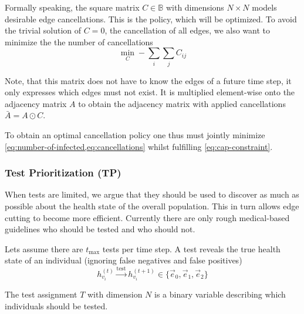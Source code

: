 Formally speaking, the square matrix $C \in \mathbb{B}$ with dimensions $N \times N$ models desirable edge cancellations.
This is the policy, which will be optimized.
To avoid the trivial solution of $C=0$, the cancellation of all edges, we also want to minimize the the number of cancellations
\begin{equation}\label{eq:cancellations}
	\min_{C} -\sum_i \sum_j C_{ij}
\end{equation}

Note, that this matrix does not have to know the edges of a future time step, it only expresses which edges must not exist.
It is multiplied element-wise onto the adjacency matrix $A$ to obtain the adjacency matrix with applied cancellations $\bar{A} = A \odot C$.


To obtain an optimal cancellation policy one thus must jointly minimize \cref{eq:number-of-infected,eq:cancellations} whilst fulfilling \cref{eq:cap-constraint}.

\subsubsection{Test Prioritization (TP)}
When tests are limited, we argue that they should be used to discover as much as possible about the health state of the overall population.
This in turn allows edge cutting to become more efficient.
Currently there are only rough medical-based guidelines who should be tested and who should not.

Lets assume there are $t_{\text{max}}$ tests per time step.
A test reveals the true health state of an individual (ignoring false negatives and false positives)
\begin{equation}
h_{{v}_i}^{(t)} \xrightarrow{\text{test}} h_{{v}_i}^{(t+1)} \in \{\vec{e}_0, \vec{e}_1, \vec{e}_2 \}
\end{equation}

The test assignment $T$ with dimension $N$ is a binary variable describing which individuals should be tested.
